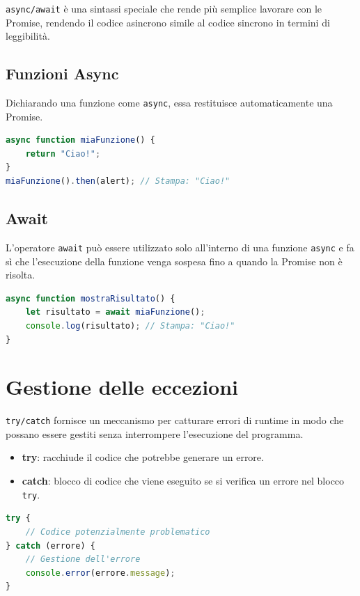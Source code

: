 \texttt{async/await} è una sintassi speciale che rende più semplice lavorare con le Promise, rendendo il codice asincrono simile al codice sincrono in termini di leggibilità.

\subsection{Funzioni Async}

Dichiarando una funzione come \texttt{async}, essa restituisce automaticamente una Promise.

\begin{lstlisting}[language=JavaScript]
async function miaFunzione() {
    return "Ciao!";
}
miaFunzione().then(alert); // Stampa: "Ciao!"
\end{lstlisting}

\subsection{Await}

L'operatore \texttt{await} può essere utilizzato solo all'interno di una funzione \texttt{async} e fa sì che l'esecuzione della funzione venga sospesa fino a quando la Promise non è risolta.

\begin{lstlisting}[language=JavaScript]
async function mostraRisultato() {
    let risultato = await miaFunzione();
    console.log(risultato); // Stampa: "Ciao!"
}
\end{lstlisting}

\section{Gestione delle eccezioni}

\texttt{try/catch} fornisce un meccanismo per catturare errori di runtime in modo che possano essere gestiti senza interrompere l'esecuzione del programma.

\begin{itemize}
    \item \textbf{try}: racchiude il codice che potrebbe generare un errore.
    \item \textbf{catch}: blocco di codice che viene eseguito se si verifica un errore nel blocco \texttt{try}.
\end{itemize}

\begin{lstlisting}[language=JavaScript]
try {
    // Codice potenzialmente problematico
} catch (errore) {
    // Gestione dell'errore
    console.error(errore.message);
}
\end{lstlisting}

